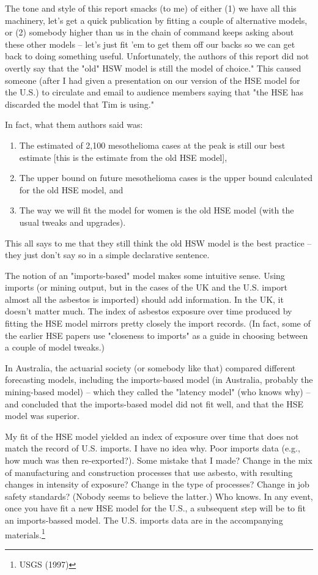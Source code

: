 \documentclass{article}\usepackage{graphicx, color}
\begin{document}
The tone and style of this report smacks (to me) of either (1) we have all this machinery, let's get a quick publication by fitting a couple of alternative models, or (2) somebody higher than us in the chain of command keeps asking about these other models -- let's just fit 'em to get them off our backs so we can get back to doing something useful.  Unfortunately, the authors of this report did not overtly say that the "old" HSW model is still the model of choice."  This caused someone (after I had given a presentation on our version of the HSE model for the U.S.) to circulate and email to audience members saying that "the HSE has discarded the model that Tim is using."

In fact, what them authors said was:

\begin{enumerate}
  \item The estimated of 2,100 mesothelioma cases at the peak is still our best estimate [this is the estimate from the old HSE model],
  \item The upper bound on future mesothelioma cases is the upper bound calculated for the old HSE model, and
  \item The way we will fit the model for women is the old HSE model (with the usual tweaks and upgrades).
\end{enumerate}

This all says to me that they still think the old HSW model is the best practice -- they just don't say so in a simple declarative sentence.

The notion of an "imports-based" model makes some intuitive sense.  Using imports (or mining output, but in the cases of the UK and the U.S. import almost all the asbestos is imported) should add information.  In the UK, it doesn't matter much.  The index of asbestos exposure over time produced by fitting the HSE model mirrors pretty closely the import records.  (In fact, some of the earlier HSE papers use "closeness to imports" as a guide in choosing between a couple of model tweaks.)

In Australia, the actuarial society (or somebody like that) compared different forecasting models, including the imports-based model (in Australia, probably the mining-based model) -- which they called the "latency model" (who knows why) -- and concluded that the imports-based model did not fit well, and that the HSE model was superior.

My fit of the HSE model yielded an index of exposure over time that does not match the record of U.S. imports.  I have no idea why.  Poor imports data (e.g., how much was then re-exported?).  Some mistake that I made?  Change in the mix of manufacturing and construction processes that use asbesto, with resulting changes in intensity of exposure?  Change in the type of processes?  Change in job safety standards?  (Nobody seems to believe the latter.)  Who knows.  In any event, once you have fit a new HSE model for the U.S., a subsequent step will be to fit an imports-bassed model.  The U.S. imports data are in the accompanying materials.\footnote{USGS (1997)}
\end{document}
